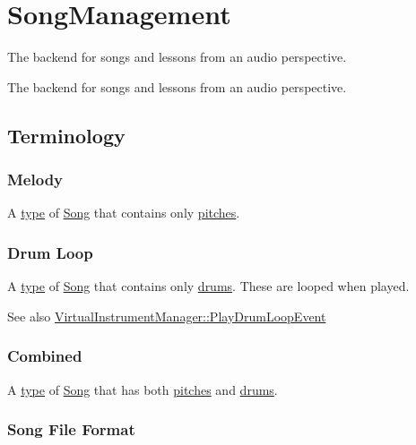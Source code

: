 \hypertarget{group___song_management}{}\section{Song\+Management}
\label{group___song_management}


The backend for songs and lessons from an audio perspective.  


The backend for songs and lessons from an audio perspective. 

\hypertarget{group___song_management_DocSongTerminology}{}\subsection{Terminology}\label{group___song_management_DocSongTerminology}
\hypertarget{group___song_management_DocSongMelody}{}\subsubsection{Melody}\label{group___song_management_DocSongMelody}
A \hyperlink{group___song_enums_gae681a1f001333e39fc1cb4fea97bfe1b}{type} of \hyperlink{class_song}{Song} that contains only \hyperlink{group___music_enums_ga508f69b199ea518f935486c990edac1d}{pitches}. \hypertarget{group___song_management_DocSongDrumLoop}{}\subsubsection{Drum Loop}\label{group___song_management_DocSongDrumLoop}
A \hyperlink{group___song_enums_gae681a1f001333e39fc1cb4fea97bfe1b}{type} of \hyperlink{class_song}{Song} that contains only \hyperlink{group___music_enums_gade475b4382c7066d1af13e7c13c029b6}{drums}. These are looped when played. \begin{DoxySeeAlso}{See also}
\hyperlink{group___v_i_m_event_types_class_virtual_instrument_manager_1_1_play_drum_loop_event}{Virtual\+Instrument\+Manager\+::\+Play\+Drum\+Loop\+Event} 
\end{DoxySeeAlso}
\hypertarget{group___song_management_DocSongCombined}{}\subsubsection{Combined}\label{group___song_management_DocSongCombined}
A \hyperlink{group___song_enums_gae681a1f001333e39fc1cb4fea97bfe1b}{type} of \hyperlink{class_song}{Song} that has both \hyperlink{group___music_enums_ga508f69b199ea518f935486c990edac1d}{pitches} and \hyperlink{group___music_enums_gade475b4382c7066d1af13e7c13c029b6}{drums}.\hypertarget{group___song_management_DocSongFileFormat}{}\subsubsection{Song File Format}\label{group___song_management_DocSongFileFormat}
